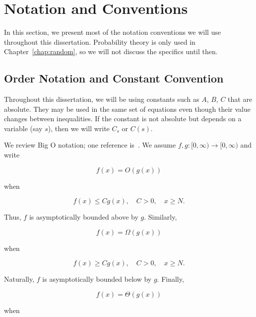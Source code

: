 \section{Notation and Conventions}
\label{sec:kar_conventions}

In this section, we present most of the notation conventions we will
use throughout this dissertation.
Probability theory is only used in Chapter~\ref{chap:random},
so we will not discuss the specifics until then.

\subsection{Order Notation and Constant Convention}

Throughout this dissertation, we will be using constants such as $A$, $B$,
$C$ that are absolute.
They may be used in the same set of equations
even though their value changes between inequalities.
If the constant is not absolute but depends on a variable (say $s$),
then we will write $C_{s}$ or $C(s)$.

We review Big O notation; one reference is~\cite[Chapter 9]{Knuth_Concrete}.
We assume $f,g:[0,\infty)\to[0,\infty)$ and write

\begin{equation}
    f(x) = O(g(x))
\end{equation}

\noindent
when

\begin{equation}
    f(x) \le C g(x),\quad C>0, \quad x\ge N.
\end{equation}

\noindent
Thus, $f$ is asymptotically bounded above by $g$.
Similarly,

\begin{equation}
    f(x) = \Omega(g(x))
\end{equation}

\noindent
when

\begin{equation}
    f(x) \ge C g(x),\quad C>0, \quad x\ge N.
\end{equation}

\noindent
Naturally, $f$ is asymptotically bounded below by $g$.
Finally,

\begin{equation}
    f(x) = \Theta(g(x))
\end{equation}

\noindent
when

